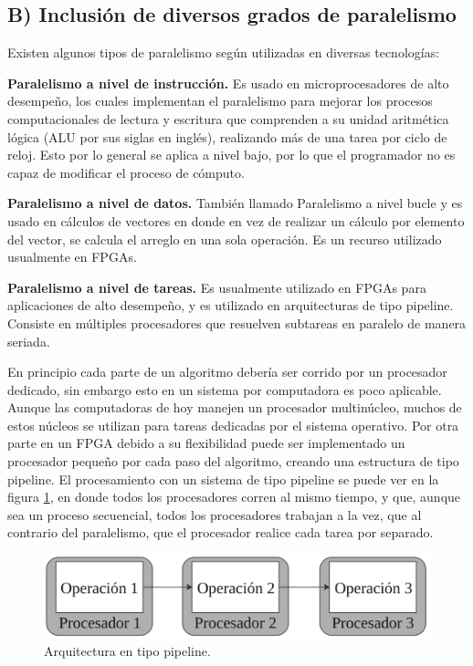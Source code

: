 \documentclass[twoside,spanish,ESP,MSc]{plantillaLabUPV}
\theoremstyle{definition}
\begin{document}
\subsection*{B) Inclusión de diversos grados de paralelismo}

Existen algunos tipos de paralelismo según \cite{paralel} utilizadas en diversas tecnologías:

\checkmark\textbf{Paralelismo a nivel de instrucción.} Es usado en microprocesadores de alto desempeño, los cuales implementan el paralelismo para mejorar los procesos computacionales de lectura y escritura que comprenden a su unidad aritmética lógica (ALU por sus siglas en inglés), realizando más de una tarea por ciclo de reloj. Esto por lo general se aplica a nivel bajo, por lo que el programador no es capaz de modificar el proceso de cómputo.

\checkmark\textbf{Paralelismo a nivel de datos.} También llamado Paralelismo a nivel bucle y es usado en cálculos de vectores en donde en vez de realizar un cálculo por elemento del vector, se calcula el arreglo en una sola operación. Es un recurso utilizado usualmente en FPGAs.

\checkmark\textbf{Paralelismo a nivel de tareas.} Es usualmente utilizado en FPGAs para aplicaciones de alto desempeño, y es utilizado en arquitecturas de tipo pipeline. Consiste en múltiples procesadores que resuelven subtareas en paralelo de manera seriada.

En principio cada parte de un algoritmo debería ser corrido por un procesador dedicado, sin embargo esto en un sistema por computadora es poco aplicable. Aunque las computadoras de hoy manejen un procesador multinúcleo, muchos de estos núcleos se utilizan para tareas dedicadas por el sistema operativo. Por otra parte en un FPGA debido a su flexibilidad puede ser implementado un procesador pequeño por cada paso del algoritmo, creando una estructura de tipo pipeline. El procesamiento con un sistema de tipo pipeline se puede ver en la figura \ref{pipe}, en donde todos los procesadores corren al mismo tiempo, y que, aunque sea un proceso secuencial, todos los procesadores trabajan a la vez, que al contrario del paralelismo, que el procesador realice cada tarea por separado.

 
\begin{figure}[!tbh]
	\centering
	\includegraphics[scale=0.4]{edrawimas/pipe}
	\caption{Arquitectura en tipo pipeline. 
		\label{pipe}}
\end{figure}
\end{document}
